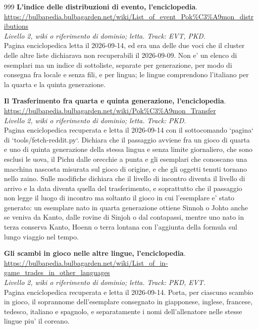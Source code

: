 \begin{thebibliography}{999}
  \textbf{L'indice delle distribuzioni di evento, l'enciclopedia}.
  \\ \url{https://bulbapedia.bulbagarden.net/wiki/List_of_event_Pok\%C3\%A9mon_distributions}
  \\ \emph{Livello 2, wiki o riferimento di dominio; letta. Track: EVT, PKD.}
  \\ Pagina enciclopedica letta il 2026-09-14, ed era una delle due voci che il cluster delle altre liste dichiarava non recuperabili il 2026-09-09. Non e' un elenco di esemplari ma un indice di sottoliste, separate per generazione, per modo di consegna fra locale e senza fili, e per lingua; le lingue comprendono l'italiano per la quarta e la quinta generazione.

  \textbf{Il Trasferimento fra quarta e quinta generazione, l'enciclopedia}.
  \\ \url{https://bulbapedia.bulbagarden.net/wiki/Pok\%C3\%A9mon_Transfer}
  \\ \emph{Livello 2, wiki o riferimento di dominio; letta. Track: PKD.}
  \\ Pagina enciclopedica recuperata e letta il 2026-09-14 con il sottocomando `pagina` di `tools/fetch-reddit.py`. Dichiara che il passaggio avviene fra un gioco di quarta e uno di quinta generazione della stessa lingua e senza limite giornaliero, che sono esclusi le uova, il Pichu dalle orecchie a punta e gli esemplari che conoscano una macchina nascosta misurata sul gioco di origine, e che gli oggetti tenuti tornano nello zaino. Sulle modifiche dichiara che il livello di incontro diventa il livello di arrivo e la data diventa quella del trasferimento, e soprattutto che il passaggio non legge il luogo di incontro ma soltanto il gioco in cui l'esemplare e' stato generato: un esemplare nato in quarta generazione ottiene Sinnoh o Johto anche se veniva da Kanto, dalle rovine di Sinjoh o dal contapassi, mentre uno nato in terza conserva Kanto, Hoenn o terra lontana con l'aggiunta della formula sul lungo viaggio nel tempo.

  \textbf{Gli scambi in gioco nelle altre lingue, l'enciclopedia}.
  \\ \url{https://bulbapedia.bulbagarden.net/wiki/List_of_in-game_trades_in_other_languages}
  \\ \emph{Livello 2, wiki o riferimento di dominio; letta. Track: PKD, EVT.}
  \\ Pagina enciclopedica recuperata e letta il 2026-09-14. Porta, per ciascuno scambio in gioco, il soprannome dell'esemplare consegnato in giapponese, inglese, francese, tedesco, italiano e spagnolo, e separatamente i nomi dell'allenatore nelle stesse lingue piu' il coreano.


\end{thebibliography}
